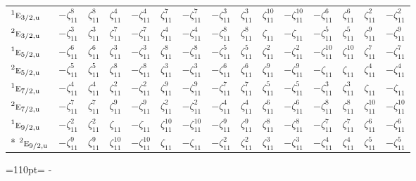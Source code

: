 \documentclass[10pt,a4paper]{article}
\newcommand{\needspace}[1]{\par\penalty-100\begingroup\dimen0=#1\relax\dimen2=\pagegoal
  \advance\dimen2-\pagetotal\ifdim\dimen0>\dimen2\relax\ifdim\dimen2>0pt\vfil\break\fi\fi
  \endgroup}
\numberwithin{equation}{section}
\newcommand{\irr}[1]{\text{\normalfont\scshape #1}}
\newcommand{\conjpair}[1]{{}^{#1}}
\newcommand{\ptag}[1]{\mathrm{#1}}
\newcommand{\rootunity}[1]{\zeta_{#1}}
\begin{document}
{\begin{longtable}{@{}lcccccccccccccc@{}}
$\conjpair{1}\irr{e}_{3/2,\ptag{u}}$ & $-\rootunity{11}^{8}$ & $\rootunity{11}^{8}$ & $\rootunity{11}^{4}$ & $-\rootunity{11}^{4}$ & $\rootunity{11}^{7}$ & $-\rootunity{11}^{7}$ & $-\rootunity{11}^{3}$ & $\rootunity{11}^{3}$ & $\rootunity{11}^{10}$ & $-\rootunity{11}^{10}$ & $-\rootunity{11}^{6}$ & $\rootunity{11}^{6}$ & $\rootunity{11}^{2}$ & $-\rootunity{11}^{2}$\\
$\conjpair{2}\irr{e}_{3/2,\ptag{u}}$ & $-\rootunity{11}^{3}$ & $\rootunity{11}^{3}$ & $\rootunity{11}^{7}$ & $-\rootunity{11}^{7}$ & $\rootunity{11}^{4}$ & $-\rootunity{11}^{4}$ & $-\rootunity{11}^{8}$ & $\rootunity{11}^{8}$ & $\rootunity{11}$ & $-\rootunity{11}$ & $-\rootunity{11}^{5}$ & $\rootunity{11}^{5}$ & $\rootunity{11}^{9}$ & $-\rootunity{11}^{9}$\\
$\conjpair{1}\irr{e}_{5/2,\ptag{u}}$ & $-\rootunity{11}^{6}$ & $\rootunity{11}^{6}$ & $\rootunity{11}^{3}$ & $-\rootunity{11}^{3}$ & $\rootunity{11}^{8}$ & $-\rootunity{11}^{8}$ & $-\rootunity{11}^{5}$ & $\rootunity{11}^{5}$ & $\rootunity{11}^{2}$ & $-\rootunity{11}^{2}$ & $-\rootunity{11}^{10}$ & $\rootunity{11}^{10}$ & $\rootunity{11}^{7}$ & $-\rootunity{11}^{7}$\\
$\conjpair{2}\irr{e}_{5/2,\ptag{u}}$ & $-\rootunity{11}^{5}$ & $\rootunity{11}^{5}$ & $\rootunity{11}^{8}$ & $-\rootunity{11}^{8}$ & $\rootunity{11}^{3}$ & $-\rootunity{11}^{3}$ & $-\rootunity{11}^{6}$ & $\rootunity{11}^{6}$ & $\rootunity{11}^{9}$ & $-\rootunity{11}^{9}$ & $-\rootunity{11}$ & $\rootunity{11}$ & $\rootunity{11}^{4}$ & $-\rootunity{11}^{4}$\\
$\conjpair{1}\irr{e}_{7/2,\ptag{u}}$ & $-\rootunity{11}^{4}$ & $\rootunity{11}^{4}$ & $\rootunity{11}^{2}$ & $-\rootunity{11}^{2}$ & $\rootunity{11}^{9}$ & $-\rootunity{11}^{9}$ & $-\rootunity{11}^{7}$ & $\rootunity{11}^{7}$ & $\rootunity{11}^{5}$ & $-\rootunity{11}^{5}$ & $-\rootunity{11}^{3}$ & $\rootunity{11}^{3}$ & $\rootunity{11}$ & $-\rootunity{11}$\\
$\conjpair{2}\irr{e}_{7/2,\ptag{u}}$ & $-\rootunity{11}^{7}$ & $\rootunity{11}^{7}$ & $\rootunity{11}^{9}$ & $-\rootunity{11}^{9}$ & $\rootunity{11}^{2}$ & $-\rootunity{11}^{2}$ & $-\rootunity{11}^{4}$ & $\rootunity{11}^{4}$ & $\rootunity{11}^{6}$ & $-\rootunity{11}^{6}$ & $-\rootunity{11}^{8}$ & $\rootunity{11}^{8}$ & $\rootunity{11}^{10}$ & $-\rootunity{11}^{10}$\\
$\conjpair{1}\irr{e}_{9/2,\ptag{u}}$ & $-\rootunity{11}^{2}$ & $\rootunity{11}^{2}$ & $\rootunity{11}$ & $-\rootunity{11}$ & $\rootunity{11}^{10}$ & $-\rootunity{11}^{10}$ & $-\rootunity{11}^{9}$ & $\rootunity{11}^{9}$ & $\rootunity{11}^{8}$ & $-\rootunity{11}^{8}$ & $-\rootunity{11}^{7}$ & $\rootunity{11}^{7}$ & $\rootunity{11}^{6}$ & $-\rootunity{11}^{6}$\\*
$\conjpair{2}\irr{e}_{9/2,\ptag{u}}$ & $-\rootunity{11}^{9}$ & $\rootunity{11}^{9}$ & $\rootunity{11}^{10}$ & $-\rootunity{11}^{10}$ & $\rootunity{11}$ & $-\rootunity{11}$ & $-\rootunity{11}^{2}$ & $\rootunity{11}^{2}$ & $\rootunity{11}^{3}$ & $-\rootunity{11}^{3}$ & $-\rootunity{11}^{4}$ & $\rootunity{11}^{4}$ & $\rootunity{11}^{5}$ & $-\rootunity{11}^{5}$\\
\bottomrule\end{longtable}}
\needspace{110pt}
\end{document}
